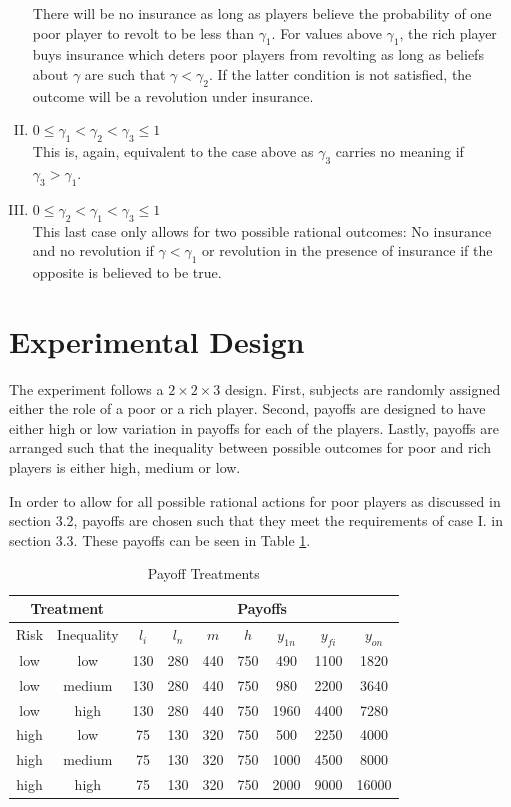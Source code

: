 \documentclass[12pt]{article}
\begin{document}
\begin{enumerate}[I.]
				There will be no insurance as long as players believe the 
				probability of one poor player to revolt to be less than 
				$\gamma_1$. For values above $\gamma_1$, the rich player buys 
				insurance which deters poor players from revolting as long as 
				beliefs about $\gamma$ are such that $\gamma<\gamma_2$. If the 
				latter condition is not satisfied, the outcome will be a 
				revolution under insurance.
		\item	$0 \leq \gamma_1 < \gamma_2 < \gamma_3 \leq 1$\\
				This is, again, equivalent to the case above as $\gamma_3$ 
				carries no meaning if $\gamma_3 > \gamma_1$.
		\item	$0 \leq \gamma_2 < \gamma_1 < \gamma_3 \leq 1$\\
				This last case only allows for two possible rational outcomes: 
				No 
				insurance and no revolution if $\gamma<\gamma_1$ or revolution 
				in the presence of insurance if the opposite is believed to be 
				true.
	\end{enumerate}
	
	\section{Experimental Design}
	The experiment follows a $2\times2\times3$ design. First, subjects are 
	randomly assigned either the role of a poor or a rich player. Second, 
	payoffs are designed to have either high or low variation in payoffs for 
	each of the players. Lastly, payoffs are arranged such that the inequality 
	between possible outcomes for poor and rich players is either high, medium 
	or low.
	
	In order to allow for all possible rational actions for poor players as 
	discussed in section 3.2, payoffs are chosen such that they meet the 
	requirements of case I. in section 3.3. These payoffs can be seen in Table 
	\ref{allpayoffs}.
	
	\begin{table}[!htbp]
		\caption{Payoff Treatments}
		\label{allpayoffs}
		\centering
		\begin{tabular}{|c|c||c|c|c|c|c|c|c|}
			\multicolumn{2}{c}{Treatment} &\multicolumn{7}{c}{Payoffs}\\
			\hline
			Risk & Inequality & $l_i$ & $l_n$ & $m$ & $h$ & $y_{1n}$ & $y_{fi}$ 
			& $y_{on}$\\
			\hline
			low & low & 130 & 280 & 440 & 750 & 490 & 1100 & 1820\\
			low & medium & 130 & 280 & 440 & 750 & 980 & 2200 & 3640\\
			low & high & 130 & 280 & 440 & 750 & 1960 & 4400 & 7280\\
			high & low & 75 & 130 & 320 & 750 & 500 & 2250 & 4000\\
			high & medium & 75 & 130 & 320 & 750 & 1000 & 4500 & 8000\\
			high & high & 75 & 130 & 320 & 750 & 2000 & 9000 & 16000\\			
			\hline
		\end{tabular}
	\end{table}
	
\end{document}
